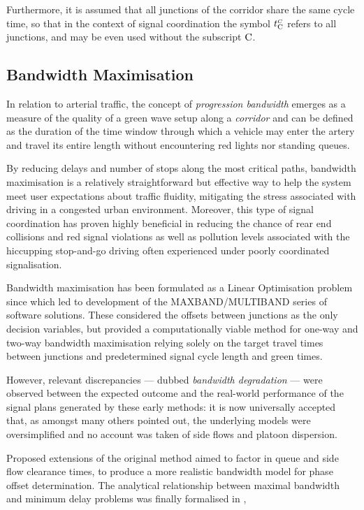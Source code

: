Furthermore, it is assumed that all junctions of the corridor share the same cycle time, so that in the context of signal coordination the symbol $t_{\mathrm{C}}^{\scriptscriptstyle{C}}$ refers to all junctions, and may be even used without the subscript $\mathrm{C}$.


\subsection{Bandwidth Maximisation} \label{s:bandmax}
In relation to arterial traffic, the concept of \emph{progression bandwidth} emerges as a measure of the quality of a green wave setup along a \emph{corridor} and can be defined as the duration of the time window through which a vehicle may enter the artery and travel its entire length without encountering red lights nor standing queues.

By reducing delays and number of stops along the most critical paths, bandwidth maximisation is a relatively straightforward but effective way to help the system meet user expectations about traffic fluidity, mitigating the stress associated with driving in a congested urban environment. Moreover, this type of signal coordination has proven highly beneficial in reducing the chance of rear end collisions and red signal violations \citep{li2010safety} as well as pollution levels associated with the hiccupping stop-and-go driving often experienced under poorly coordinated signalisation.

Bandwidth maximisation has been formulated as a Linear Optimisation problem since \citep{little1981maxband} which led to development of the MAXBAND/MULTIBAND series of software solutions. These considered the offsets between junctions as the only decision variables, but provided a computationally viable method for one-way and two-way bandwidth maximisation relying solely on the target travel times between junctions and predetermined signal cycle length and green times.

However, relevant discrepancies — dubbed \emph{bandwidth degradation} — were observed between the expected outcome and the real-world performance of the signal plans generated by these early methods: it is now universally accepted that, as \citep{tsay1988new} amongst many others pointed out, the underlying models were oversimplified and no account was taken of side flows and platoon dispersion. 

Proposed extensions of the original method aimed to factor in queue and side flow clearance times, to produce a more realistic bandwidth model for phase offset determination. The analytical relationship between maximal bandwidth and minimum delay problems was finally formalised in \citep{papola2000new}, 

